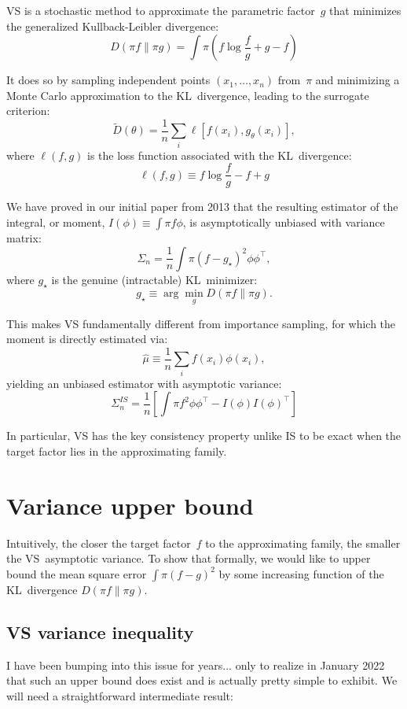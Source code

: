 \documentclass{article}
\begin{document}
VS is a stochastic method to approximate the parametric factor~$g$ that minimizes the generalized Kullback-Leibler divergence:
$$
D(\pi f\|\pi g)
= \int \pi (f \log \frac{f}{g} + g - f)
$$

It does so by sampling independent points $(x_1,\ldots,x_n)$ from~$\pi$ and minimizing a Monte Carlo approximation to the KL~divergence, leading to the surrogate criterion:
$$
\tilde{D}(\theta) = \frac{1}{n} \sum_i \ell[ f(x_i), g_\theta(x_i) ],
$$
where $\ell(f, g)$ is the loss function associated with the KL~divergence:
$$
\ell(f, g) \equiv f \log \frac{f}{g} - f + g
$$
  
We have proved in our initial paper from 2013 that the resulting estimator of the integral, or moment, $I(\phi) \equiv \int \pi f \phi$, is asymptotically unbiased with variance matrix:
$$
\Sigma_n = \frac{1}{n} \int \pi (f - g_\star)^2 \phi \phi^\top,
$$
where $g_\star$ is the genuine (intractable) KL~minimizer:
$$
g_\star \equiv \arg\min_g D(\pi f\|\pi g).
$$

This makes VS fundamentally different from importance sampling, for which the moment is directly estimated via:
$$
\hat{\mu} \equiv \frac{1}{n} \sum_i f(x_i)\phi(x_i),
$$
yielding an unbiased estimator with asymptotic variance:
$$
\Sigma_n^{IS} = \frac{1}{n} \left[
\int \pi f^2 \phi \phi^\top
- I(\phi) I(\phi)^\top
\right]
$$

In particular, VS has the key consistency property unlike IS to be exact when the target factor lies in the approximating family. 


\section{Variance upper bound}

Intuitively, the closer the target factor~$f$ to the approximating family, the smaller the VS~asymptotic variance. To show that formally, we would like to upper bound the mean square error $\int\pi(f-g)^2$ by some increasing function of the KL~divergence $D(\pi f\|\pi g)$. 

\subsection{VS variance inequality}

I have been bumping into this issue for years... only to realize in January 2022 that such an upper bound does exist and is actually pretty simple to exhibit. We will need a straightforward intermediate result:
\end{document}
